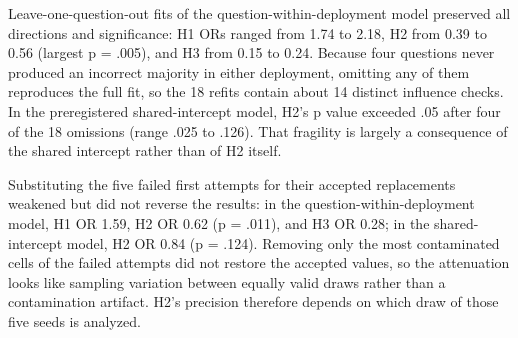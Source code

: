 \documentclass[11pt]{article}
\begin{document}
Leave-one-question-out fits of the question-within-deployment model preserved all directions and significance: H1 ORs ranged from 1.74 to 2.18, H2 from 0.39 to 0.56 (largest p = .005), and H3 from 0.15 to 0.24. Because four questions never produced an incorrect majority in either deployment, omitting any of them reproduces the full fit, so the 18 refits contain about 14 distinct influence checks. In the preregistered shared-intercept model, H2's p value exceeded .05 after four of the 18 omissions (range .025 to .126). That fragility is largely a consequence of the shared intercept rather than of H2 itself.

Substituting the five failed first attempts for their accepted replacements weakened but did not reverse the results: in the question-within-deployment model, H1 OR 1.59, H2 OR 0.62 (p = .011), and H3 OR 0.28; in the shared-intercept model, H2 OR 0.84 (p = .124). Removing only the most contaminated cells of the failed attempts did not restore the accepted values, so the attenuation looks like sampling variation between equally valid draws rather than a contamination artifact. H2's precision therefore depends on which draw of those five seeds is analyzed.


\begin{table}[htbp]
\centering
\caption{Post-review robustness analyses}
\scriptsize
{}
\end{table}
\FloatBarrier
\end{document}
